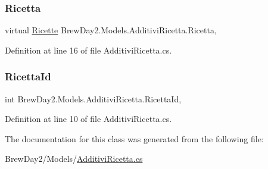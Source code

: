 \mbox{\label{class_brew_day2_1_1_models_1_1_additivi_ricetta_adaebdcec4e6afff9d235dd15806df3a7}} 
\subsubsection{\texorpdfstring{Ricetta}{Ricetta}}
{\footnotesize\ttfamily virtual \mbox{\hyperlink{class_brew_day2_1_1_models_1_1_ricette}{Ricette}} Brew\+Day2.\+Models.\+Additivi\+Ricetta.\+Ricetta\hspace{0.3cm}{\ttfamily [get]}, {\ttfamily [set]}}



Definition at line 16 of file Additivi\+Ricetta.\+cs.

\mbox{\label{class_brew_day2_1_1_models_1_1_additivi_ricetta_a083fb6283b67dc08f8e2806b6e9a2fa8}} 
\subsubsection{\texorpdfstring{Ricetta\+Id}{RicettaId}}
{\footnotesize\ttfamily int Brew\+Day2.\+Models.\+Additivi\+Ricetta.\+Ricetta\+Id\hspace{0.3cm}{\ttfamily [get]}, {\ttfamily [set]}}



Definition at line 10 of file Additivi\+Ricetta.\+cs.



The documentation for this class was generated from the following file\+:\begin{DoxyCompactItemize}
\item 
Brew\+Day2/\+Models/\mbox{\hyperlink{_additivi_ricetta_8cs}{Additivi\+Ricetta.\+cs}}\end{DoxyCompactItemize}

